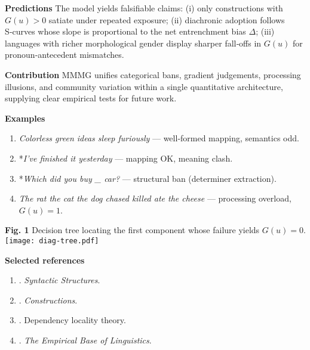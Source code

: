 \documentclass[11pt]{article}
\begin{document}
\noindent\textbf{Predictions} The model yields falsifiable claims: (i) only constructions with \(G(u)>0\) satiate under repeated exposure; (ii) diachronic adoption follows S‑curves whose slope is proportional to the net entrenchment bias \(\Delta\); (iii) languages with richer morphological gender display sharper fall‑offs in \(G(u)\) for pronoun‑antecedent mismatches.

\medskip
\noindent\textbf{Contribution} MMMG unifies categorical bans, gradient judgements, processing illusions, and community variation within a single quantitative architecture, supplying clear empirical tests for future work.

\clearpage
\noindent\textbf{Examples}\\[-0.8\baselineskip]
\begin{enumerate}
\item[] \emph{Colorless green ideas sleep furiously} — well‑formed mapping, semantics odd.  
\item[] *\emph{I’ve finished it yesterday} — mapping OK, meaning clash.  
\item[] *\emph{Which did you buy \_ car?} — structural ban (determiner extraction).  
\item[] \emph{The rat the cat the dog chased killed ate the cheese} — processing overload, \(G(u)=1\).
\end{enumerate}

\medskip
\noindent\textbf{Fig. 1} Decision tree locating the first component whose failure yields \(G(u)=0\).  
\texttt{[image: diag-tree.pdf]}  %

\medskip
\noindent\textbf{Selected references}\\[-0.8\baselineskip]
\begin{enumerate}
\setlength\itemsep{0pt}
\item \textcite{chomsky1957}. \emph{Syntactic Structures}.  
\item \textcite{goldberg1995constructions}. \emph{Constructions}.  
\item \textcite{gibson2000}. Dependency locality theory.  
\item \textcite{schutze2016}. \emph{The Empirical Base of Linguistics}.  
\end{enumerate}
\end{document}
